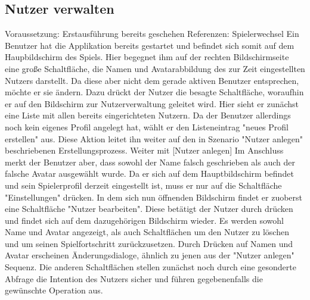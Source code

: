 \subsection{Nutzer verwalten}
Voraussetzung: Erstausführung bereits geschehen \newline
Referenzen: Spielerwechsel
\newline
\newline
Ein Benutzer hat die Applikation bereits gestartet und befindet sich somit
auf dem Haupbildschirm des Spiels. Hier begegnet ihm auf der rechten 
Bildschirmseite eine große Schaltfläche, die Namen und Avatarabbildung des 
zur Zeit eingestellten Nutzers darstellt. Da diese aber nicht dem gerade aktiven
Benutzer entsprechen, möchte er sie ändern. Dazu drückt der Nutzer die
besagte Schaltfläche, woraufhin er auf den Bildschirm zur Nutzerverwaltung 
geleitet wird. Hier sieht er zunächst eine Liste mit allen bereits 
eingerichteten Nutzern. Da der Benutzer allerdings noch kein eigenes Profil
angelegt hat, wählt er den Listeneintrag "neues Profil erstellen" aus.
Diese Aktion leitet ihn weiter auf den in Szenario "Nutzer anlegen" 
beschriebenen Erstellungsprozess.
\newline
\newline
Weiter mit {[}Nutzer anlegen{]}
\newline
\newline
Im Anschluss merkt der Benutzer aber, dass sowohl der Name falsch geschrieben
als auch der falsche Avatar ausgewählt wurde. Da er sich auf dem
Hauptbildschirm befindet und sein Spielerprofil derzeit eingestellt ist,
muss er nur auf die Schaltfläche "Einstellungen" drücken. In dem sich nun
öffnenden Bildschirm findet er zuoberst eine Schaltfläche "Nutzer bearbeiten".
Diese betätigt der Nutzer durch drücken und findet sich auf dem dazugehörigen
Bildschirm wieder. Es werden sowohl Name und Avatar angezeigt, als auch
Schaltflächen um den Nutzer zu löschen und um seinen Spielfortschritt
zurückzusetzen. Durch Drücken auf Namen und Avatar erscheinen Änderungsdialoge,
ähnlich zu jenen aus der "Nutzer anlegen" Sequenz. Die anderen Schaltflächen
stellen zunächst noch durch eine gesonderte Abfrage die Intention des 
Nutzers sicher und führen gegebenenfalls die gewünschte Operation aus.
